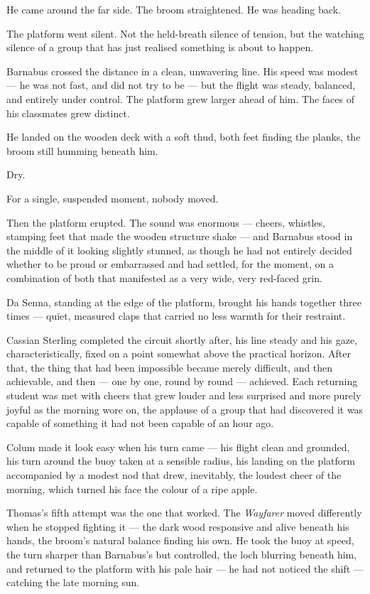 He came around the far side. The broom straightened. He was heading back.
 
The platform went silent. Not the held-breath silence of tension, but the watching silence of a group that has just realised something is about to happen.
 
Barnabus crossed the distance in a clean, unwavering line. His speed was modest --- he was not fast, and did not try to be --- but the flight was steady, balanced, and entirely under control. The platform grew larger ahead of him. The faces of his classmates grew distinct.
 
He landed on the wooden deck with a soft thud, both feet finding the planks, the broom still humming beneath him.
 
Dry.
 
For a single, suspended moment, nobody moved.
 
Then the platform erupted. The sound was enormous --- cheers, whistles, stamping feet that made the wooden structure shake --- and Barnabus stood in the middle of it looking slightly stunned, as though he had not entirely decided whether to be proud or embarrassed and had settled, for the moment, on a combination of both that manifested as a very wide, very red-faced grin.
 
Da Senna, standing at the edge of the platform, brought his hands together three times --- quiet, measured claps that carried no less warmth for their restraint.
 
Cassian Sterling completed the circuit shortly after, his line steady and his gaze, characteristically, fixed on a point somewhat above the practical horizon. After that, the thing that had been impossible became merely difficult, and then achievable, and then --- one by one, round by round --- achieved. Each returning student was met with cheers that grew louder and less surprised and more purely joyful as the morning wore on, the applause of a group that had discovered it was capable of something it had not been capable of an hour ago.
 
Colum made it look easy when his turn came --- his flight clean and grounded, his turn around the buoy taken at a sensible radius, his landing on the platform accompanied by a modest nod that drew, inevitably, the loudest cheer of the morning, which turned his face the colour of a ripe apple.
 
Thomas's fifth attempt was the one that worked. The \textit{Wayfarer} moved differently when he stopped fighting it --- the dark wood responsive and alive beneath his hands, the broom's natural balance finding his own. He took the buoy at speed, the turn sharper than Barnabus's but controlled, the loch blurring beneath him, and returned to the platform with his pale hair --- he had not noticed the shift --- catching the late morning sun.
 
